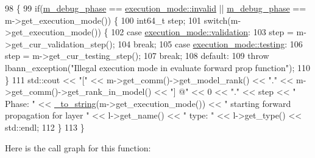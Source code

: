 \begin{DoxyCode}
98                                                                                  \{
99   \textcolor{keywordflow}{if}(\hyperlink{classlbann_1_1lbann__callback__debug_acc66ab699534e42aa958148f1fb3fd6f}{m\_debug\_phase} == \hyperlink{base_8hpp_a2781a159088df64ed7d47cc91c4dc0a8afedb2d84cafe20862cb4399751a8a7e3}{execution\_mode::invalid} || 
      \hyperlink{classlbann_1_1lbann__callback__debug_acc66ab699534e42aa958148f1fb3fd6f}{m\_debug\_phase} == m->get\_execution\_mode()) \{
100     int64\_t step;
101     \textcolor{keywordflow}{switch}(m->get\_execution\_mode()) \{
102     \textcolor{keywordflow}{case} \hyperlink{base_8hpp_a2781a159088df64ed7d47cc91c4dc0a8aa617908b172c473cb8e8cda059e55bf0}{execution\_mode::validation}:
103       step = m->get\_cur\_validation\_step();
104       \textcolor{keywordflow}{break};
105     \textcolor{keywordflow}{case} \hyperlink{base_8hpp_a2781a159088df64ed7d47cc91c4dc0a8aae2b1fca515949e5d54fb22b8ed95575}{execution\_mode::testing}:
106       step = m->get\_cur\_testing\_step();
107       \textcolor{keywordflow}{break};
108     \textcolor{keywordflow}{default}:
109       \textcolor{keywordflow}{throw} lbann\_exception(\textcolor{stringliteral}{"Illegal execution mode in evaluate forward prop function"});
110     \}
111     std::cout << \textcolor{stringliteral}{"["} << m->get\_comm()->get\_model\_rank() << \textcolor{stringliteral}{"."} << m->get\_comm()->get\_rank\_in\_model() << \textcolor{stringliteral}{"]
       @"} << 0 << \textcolor{stringliteral}{"."} << step << \textcolor{stringliteral}{" Phase: "} << \hyperlink{base_8hpp_adeeaddd10bd31df0cae7cb0fcae45d5c}{\_to\_string}(m->get\_execution\_mode()) << \textcolor{stringliteral}{" starting forward
       propagation for layer "} << l->get\_name() << \textcolor{stringliteral}{" type: "} << l->get\_type() << std::endl;
112   \}
113 \}
\end{DoxyCode}
Here is the call graph for this function\+:\nopagebreak
